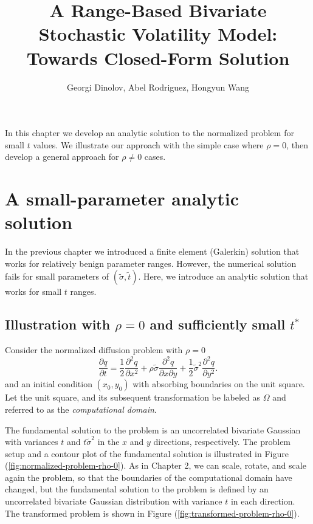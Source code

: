 \documentclass[10pt]{article}
\title{A Range-Based Bivariate Stochastic Volatility Model: Towards Closed-Form Solution}
\author{Georgi Dinolov, Abel Rodriguez, Hongyun Wang}
\date{} %
\begin{document}
\def\spacingset#1{\renewcommand{\baselinestretch}%
{#1}\small\normalsize} \spacingset{1}

\bigskip

\vspace{1cm}

In this chapter we develop an analytic solution to the normalized
problem for small $t$ values. We illustrate our approach with the
simple case where $\rho=0$, then develop a general approach for
$\rho \neq 0$ cases.

\section{A small-parameter analytic solution}
In the previous chapter we introduced a finite element (Galerkin)
solution that works for relatively benign parameter ranges. However,
the numerical solution fails for small parameters of
$(\tilde{\sigma}, \tilde{t})$. Here, we introduce an analytic solution
that works for small $t$ ranges.

\subsection{Illustration with $\rho=0$ and sufficiently small
  $t^{*}$}
Consider the normalized diffusion problem with $\rho=0$
\begin{equation}
  \frac{\partial q}{\partial t} = \frac{1}{2}\frac{\partial^2 q}{\partial x^2} + \rho\tilde{\sigma}\frac{\partial^2 q}{\partial x \partial y} + \frac{1}{2}\tilde{\sigma}^2 \frac{\partial^2 q}{\partial y^2}. \label{eq:standard-diffusion}
\end{equation}
and an initial condition $(x_0, y_0)$ with absorbing boundaries on the
unit square. Let the unit square, and its subsequent transformation be
labeled as $\Omega$ and referred to as the \textit{computational domain}.

The fundamental solution to the problem is an uncorrelated bivariate
Gaussian with variances $t$ and $t\tilde{\sigma}^2$ in the $x$ and $y$
directions, respectively. The problem setup and a contour plot of the
fundamental solution is illustrated in Figure
(\ref{fig:normalized-problem-rho-0}). As in Chapter 2, we can scale,
rotate, and scale again the problem, so that the boundaries of the
computational domain have changed, but the fundamental solution to the
problem is defined by an uncorrelated bivariate Gaussian distribution
with variance $t$ in each direction. The transformed problem is shown
in Figure (\ref{fig:transformed-problem-rho-0}).
\end{document}
